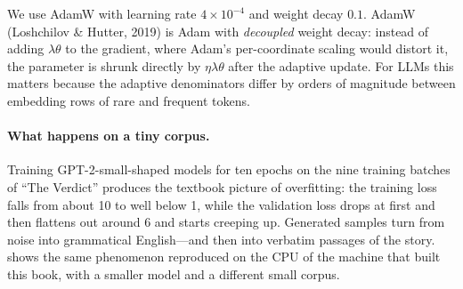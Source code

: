 We use AdamW with learning rate $4\times10^{-4}$ and weight decay $0.1$. AdamW
(Loshchilov \& Hutter, 2019) is Adam with \emph{decoupled} weight decay: instead of adding
$\lambda\theta$ to the gradient, where Adam's per-coordinate scaling would distort it, the
parameter is shrunk directly by $\eta\lambda\theta$ after the adaptive update. For LLMs this
matters because the adaptive denominators differ by orders of magnitude between embedding
rows of rare and frequent tokens.

\paragraph{What happens on a tiny corpus.} Training GPT-2-small-shaped models for ten epochs on
the nine training batches of ``The Verdict'' produces the textbook picture of overfitting: the
training loss falls from about 10 to well below 1, while the validation loss drops at first
and then flattens out around 6 and starts creeping up. Generated samples turn from noise into
grammatical English---and then into verbatim passages of the story. 
shows the same phenomenon reproduced on the CPU of the machine that built this book, with a
smaller model and a different small corpus.

